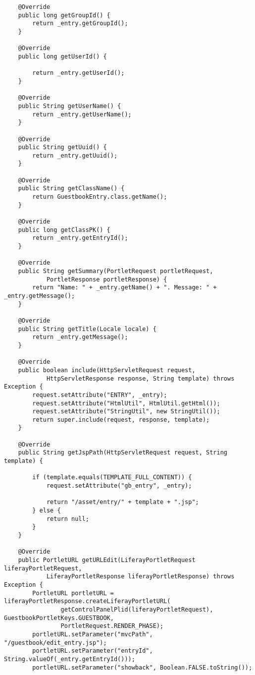 \begin{verbatim}
    @Override
    public long getGroupId() {
        return _entry.getGroupId();
    }

    @Override
    public long getUserId() {

        return _entry.getUserId();
    }

    @Override
    public String getUserName() {
        return _entry.getUserName();
    }

    @Override
    public String getUuid() {
        return _entry.getUuid();
    }

    @Override
    public String getClassName() {
        return GuestbookEntry.class.getName();
    }

    @Override
    public long getClassPK() {
        return _entry.getEntryId();
    }

    @Override
    public String getSummary(PortletRequest portletRequest, 
            PortletResponse portletResponse) {
        return "Name: " + _entry.getName() + ". Message: " + _entry.getMessage();
    }

    @Override
    public String getTitle(Locale locale) {
        return _entry.getMessage();
    }

    @Override
    public boolean include(HttpServletRequest request, 
            HttpServletResponse response, String template) throws Exception {
        request.setAttribute("ENTRY", _entry);
        request.setAttribute("HtmlUtil", HtmlUtil.getHtml());
        request.setAttribute("StringUtil", new StringUtil());
        return super.include(request, response, template);
    }

    @Override
    public String getJspPath(HttpServletRequest request, String template) {

        if (template.equals(TEMPLATE_FULL_CONTENT)) {
            request.setAttribute("gb_entry", _entry);

            return "/asset/entry/" + template + ".jsp";
        } else {
            return null;
        }
    }

    @Override
    public PortletURL getURLEdit(LiferayPortletRequest liferayPortletRequest,
            LiferayPortletResponse liferayPortletResponse) throws Exception {
        PortletURL portletURL = liferayPortletResponse.createLiferayPortletURL(
                getControlPanelPlid(liferayPortletRequest), GuestbookPortletKeys.GUESTBOOK,
                PortletRequest.RENDER_PHASE);
        portletURL.setParameter("mvcPath", "/guestbook/edit_entry.jsp");
        portletURL.setParameter("entryId", String.valueOf(_entry.getEntryId()));
        portletURL.setParameter("showback", Boolean.FALSE.toString());


\end{verbatim}

